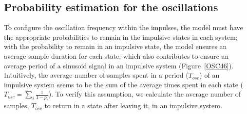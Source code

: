 \documentclass[journal]{IEEEtran}
\begin{document}
\subsection{Probability estimation for the oscillations}
To configure the oscillation frequency within the impulses, the model must have the appropriate probabilities to remain in the impulsive states in each system; with the probability to remain in an impulsive state, the model ensures an average sample duration for each state, which also contributes to ensure an average period of a sinusoid signal in an impulsive system (Figure~\ref{OSC46}). Intuitively, the average number of samples spent in a period ($T_{osc}$) of an impulsive system seems to be the sum of the average times spent in each state ($T_{osc}=\sum\limits_{i}\frac{1}{1-p_{i}}$). To verify this assumption, we calculate the average number of samples, $T_{osc}$ to return in a state after leaving it, in an impulsive system.\
\end{document}
